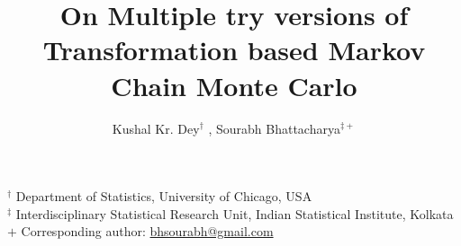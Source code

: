 \documentclass[11pt, DIV10,a4paper]{article}
\begin{document}
\title{\textbf{On Multiple try versions of Transformation based Markov Chain Monte Carlo}}
\author{ Kushal Kr. Dey$^{\dag}$ , Sourabh Bhattacharya$^{\ddag +}$ }
\date{}
\maketitle
\begin{center}
$^{\dag}$   Department of Statistics, University of Chicago, USA \\
$^{\ddag}$   Interdisciplinary Statistical Research Unit, Indian Statistical Institute, Kolkata \\
$+$ Corresponding author:  \href{mailto: bhsourabh@gmail.com}{bhsourabh@gmail.com}
\end{center}

\end{document}
